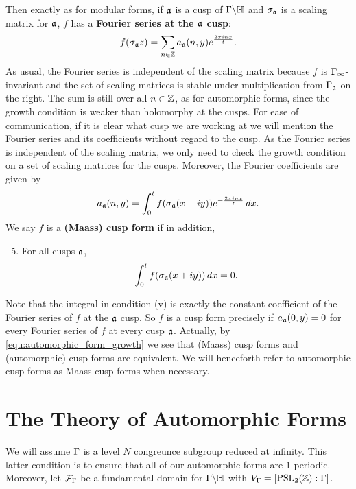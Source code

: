       Then exactly as for modular forms, if $\mathfrak{a}$ is a cusp of $\Gamma\backslash\mathbb{H}$ and $\sigma_{\mathfrak{a}}$ is a scaling matrix for $\mathfrak{a}$, $f$ has a \textbf{Fourier series at the $\mathfrak{a}$ cusp}:
      \[
        f(\sigma_{\mathfrak{a}}z) = \sum_{n \in \mathbb{Z}}a_{\mathfrak{a}}(n,y)e^{\frac{2\pi inx}{t}}.
      \]
      As usual, the Fourier series is independent of the scaling matrix because $f$ is $\Gamma_{\infty}$-invariant and the set of scaling matrices is stable under multiplication from $\Gamma_{\mathfrak{a}}$ on the right. The sum is still over all $n \in \mathbb{Z}$, as for automorphic forms, since the growth condition is weaker than holomorphy at the cusps. For ease of communication, if it is clear what cusp we are working at we will mention the Fourier series and its coefficients without regard to the cusp. As the Fourier series is independent of the scaling matrix, we only need to check the growth condition on a set of scaling matrices for the cusps. Moreover, the Fourier coefficients are given by
      \[
        a_{\mathfrak{a}}(n,y) = \int_{0}^{t}f(\sigma_{\mathfrak{a}}(x+iy))e^{-\frac{2\pi inx}{t}}\,dx.
      \]
      We say $f$ is a \textbf{(Maass) cusp form} if in addition,
      \begin{enumerate}[label=(\roman*)]
        \setcounter{enumi}{4}
        \item For all cusps $\mathfrak{a}$,
        \[
          \int_{0}^{t}f(\sigma_{\mathfrak{a}}(x+iy))\,dx = 0.
        \]
      \end{enumerate}
      Note that the integral in condition (v) is exactly the constant coefficient of the Fourier series of $f$ at the $\mathfrak{a}$ cusp. So $f$ is a cusp form precisely if $a_{\mathfrak{a}}(0,y) = 0$ for every Fourier series of $f$ at every cusp $\mathfrak{a}$. Actually, by \cref{equ:automorphic_form_growth} we see that (Maass) cusp forms and (automorphic) cusp forms are equivalent. We will henceforth refer to automorphic cusp forms as Maass cusp forms when necessary.
  \section{The Theory of Automorphic Forms}
    We will assume $\Gamma$ is a level $N$ congreunce subgroup reduced at infinity. This latter condition is to ensure that all of our automorphic forms are $1$-periodic. Moreover, let $\mathcal{F}_{\Gamma}$ be a fundamental domain for $\Gamma\backslash\mathbb{H}$ with $V_{\Gamma} = [\mathrm{PSL}_{2}(\mathbb{Z}):\Gamma]$.

